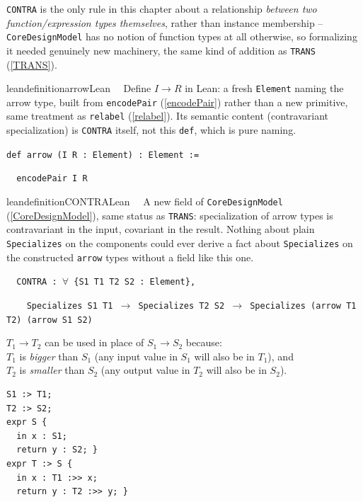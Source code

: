 \pn \texttt{CONTRA} is the only rule in this chapter about a relationship \emph{between two
function/expression types themselves}, rather than instance membership -- \texttt{CoreDesignModel}
has no notion of function types at all otherwise, so formalizing it needed genuinely new
machinery, the same kind of addition as \texttt{TRANS} (\ref{TRANS}).

\begin{restatable}{leandefinition}{arrowLean}~~ Define $I \rightarrow R$ in Lean: a
fresh \texttt{Element} naming the arrow type, built from \texttt{encodePair} (\ref{encodePair})
rather than a new primitive, same treatment as \texttt{relabel} (\ref{relabel}). Its semantic
content (contravariant specialization) is \texttt{CONTRA} itself, not this \texttt{def}, which is
pure naming.

\texttt{\textcolor{leancolor}{def} \textcolor{leanyellow}{arrow} (I R : Element) : Element :=}

\texttt{~~encodePair I R}
\label{arrow}
\end{restatable}

\begin{restatable}{leandefinition}{CONTRALean}~~ A new field of
\texttt{CoreDesignModel} (\ref{CoreDesignModel}), same status as \texttt{TRANS}: specialization of
arrow types is contravariant in the input, covariant in the result. Nothing about plain
\texttt{Specializes} on the components could ever derive a fact about \texttt{Specializes} on the
constructed \texttt{arrow} types without a field like this one.

\texttt{~~CONTRA : $\forall$ \{S1 T1 T2 S2 : Element\},}

\texttt{~~~~Specializes S1 T1 $\to$ Specializes T2 S2 $\to$ Specializes (arrow T1 T2) (arrow S1 S2)}
\label{CONTRA}
\end{restatable}

$T_1 \rightarrow T_2$ can be used in place of $S_1 \rightarrow S_2$ because: \\
$T_1$ is \emph{bigger} than $S_1$ (any input value in $S_1$ will also be in $T_1$), and \\
$T_2$ is \emph{smaller} than $S_2$ (any output value in $T_2$ will also be in $S_2$).

\begin{lstlisting}
S1 :> T1;
T2 :> S2;
expr S {
  in x : S1;
  return y : S2; }
expr T :> S {
  in x : T1 :>> x;
  return y : T2 :>> y; } 
\end{lstlisting}


